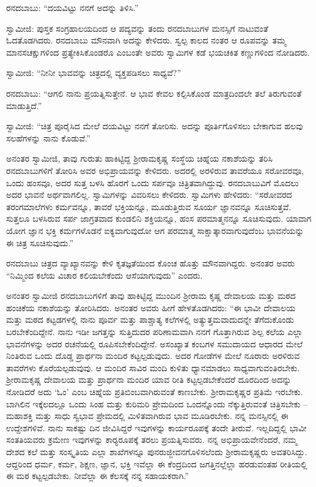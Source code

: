  ರನದಬಾಬು: “ದಯವಿಟ್ಟು ನನಗೆ ಅದನ್ನು ತಿಳಿಸಿ.” 

 ಸ್ವಾಮೀಜಿ: ಪುಸ್ತಕ ಸಂಗ್ರಹಾಲಯದಿಂದ ಆ ಪದ್ಯವನ್ನು ತಂದು ರನದಬಾಬುಗಳ ಮನಸ್ಸಿಗೆ ನಾಟುವಂತೆ ಓದತೊಡಗಿದರು. ರನದಬಾಬು ಮೌನವಾಗಿ ಅದನ್ನು ಕೇಳಿದರು. ಸ್ವಲ್ಪ ಕಾಲದ ನಂತರ ಆ ರೂಪವನ್ನು ತಮ್ಮ ಮಾನಸಚಕ್ಷುಗಳಿಂದ ಪ್ರತ್ಯೇಕಿಸಿಕೊಂಡರೊ ಎಂಬಂತೇ ಅವರು ಸ್ವಾಮಿಗಳ ಕಡೆ ಭಯಚಕಿತ ಕಣ್ಣುಗಳಿಂದ ನೋಡಿದರು. 

 ಸ್ವಾಮೀಜಿ: “ನೀನೀ ಭಾವವನ್ನು ಚಿತ್ರದಲ್ಲಿ ವ್ಯಕ್ತಪಡಿಸಲು ಸಾಧ್ಯವೆ?” 

 ರನದಬಾಬು: “ಆಗಲಿ ನಾನು ಪ್ರಯತ್ನಿಸುತ್ತೇನೆ. ಆ ಭಾವ ಕೇವಲ ಕಲ್ಪಿಸಿಕೊಂಡ ಮಾತ್ರದಿಂದಲೇ ತಲೆ ತಿರುಗುವಂತೆ ಮಾಡುತ್ತಿದೆ.” 

 ಸ್ವಾಮೀಜಿ: “ಚಿತ್ರ ಪೂರೈಸಿದ ಮೇಲೆ ದಯವಿಟ್ಟು ನನಗೆ ತೋರಿಸು. ಅದನ್ನು ಪೂರ್ತಿಗೊಳಿಸಲು ಬೇಕಾಗುವ ಹಲವು ಸಲಹೆಗಳನ್ನು ನಾನು ಕೊಡುವೆ.” 

 ಅನಂತರ ಸ್ವಾಮೀಜಿ, ತಾವು ಗುರುತು ಹಾಕಿಟ್ಟಿದ್ದ ಶ‍್ರೀರಾಮಕೃಷ್ಣ ಸಂಸ್ಥೆಯ ಚಿಹ್ನೆಯ ನಕಾಶೆಯನ್ನು ತರಿಸಿ ರನದಬಾಬುಗಳಿಗೆ ತೋರಿಸಿ ಅವರ ಅಭಿಪ್ರಾಯವನ್ನು ಕೇಳಿದರು. ಅದರಲ್ಲಿ ಅರಳಿರುವ ತಾವರೆಯೂ ಸರೋವರವೂ, ಒಂದು ಹಂಸವೂ, ಅದರ ಸುತ್ತ ಬಳಸಿ ಹೊರಗೆ ಒಂದು ಸರ್ಪವೂ ಚಿತ್ರಿತವಾಗಿದ್ದುವು. ರನದಬಾಬುವಿಗೆ ಮೊದಲು ಅದರ ಭಾವನೆ ಅರ್ಥವಾಗಲಿಲ್ಲ. ಸ್ವಾಮಿಗಳನ್ನು ವಿವರಿಸಲು ಕೇಳಿದರು. ಸ್ವಾಮಿಗಳು ಹೇಳಿದರು: “ಸರೋವರದ ತರಂಗಮಾಲೆಗಳು ಕರ್ಮವನ್ನೂ, ತಾವರೆ ಭಕ್ತಿಯನ್ನೂ, ಮೂಡುತ್ತಿರುವ ಸೂರ್ಯ ಜ್ಞಾನವನ್ನೂ ಸೂಚಿಸುತ್ತವೆ. ಸುತ್ತಲೂ ಬಳಸಿರುವ ಸರ್ಪ ಜಾಗ್ರತವಾದ ಕುಂಡಲಿನಿ ಶಕ್ತಿಯನ್ನೂ, ಹಂಸ ಪರಮಾತ್ಮನನ್ನೂ ಸೂಚಿಸುವುದು. ಯಾವಾಗ ಯೋಗ ಜ್ಞಾನ ಭಕ್ತಿ ಕರ್ಮಗಳೊಡನೆ ಐಕ್ಯವಾಗುವುದೋ ಆಗ ಪರಮಾತ್ಮ ಸಾಕ್ಷಾತ್ಕಾರವಾಗುವುದೆಂಬ ಭಾವನೆಯನ್ನು ಈ ಚಿತ್ರ ಸೂಚಿಸುವುದು.” 

 ರನದಬಾಬು ಚಿತ್ರದ ವ್ಯಾಖ್ಯಾನವನ್ನು ಕೇಳಿ ಕೃತಜ್ಞತೆಯಿಂದ ಕೊಂಚ ಹೊತ್ತು ಮೌನವಾಗಿದ್ದರು. ಅನಂತರ ಅವರು “ನಿಮ್ಮಿಂದ ಕಲೆಯ ವಿಚಾರ ಕಲಿಯಬೇಕೆಂದು ಆಸೆಯಾಗುವುದು” ಎಂದರು. 

 ಅನಂತರ ಸ್ವಾಮೀಜಿ ರನದಬಾಬುಗಳಿಗೆ ತಾವು ಹಾಕಿಟ್ಟಿದ್ದ ಮುಂದಿನ ಶ‍್ರೀರಾಮ ಕೃಷ್ಣ ದೇವಾಲಯ ಮತ್ತು ಮಠದ ಹಂಚಿಕೆಯ ನಕಾಶೆಯನ್ನು ತೋರಿಸಿದರು. ಅನಂತರ ಅವರು ಹೀಗೆ ಹೇಳತೊಡಗಿದರು: “ಈ ಭಾವೀ ದೇವಾಲಯ ಮತ್ತು ಮಠದ ಕಟ್ಟಡಗಳಲ್ಲಿ ನಾನು ಪೂರ್ವ ಮತ್ತು ಪಾಶ್ಚಾತ್ಯ ಕಲೆಗಳಲ್ಲಿ ಅತ್ಯುತ್ತಮವಾದುದನ್ನೇ ತೆಗೆದುಕೊಂಡು ಬರಬೇಕೆಂದಿದ್ದೇನೆ. ನಾನು ಇಡೀ ಜಗತ್ತನ್ನು ಸುತ್ತಿದುದರ ಪರಿಣಾಮವಾಗಿ ನನಗೆ ಗೊತ್ತಾಗಿರುವ ಶಿಲ್ಪ ಕಲೆಯ ಎಲ್ಲಾ ಭಾವನೆಗಳನ್ನು ಅದರ ರಚನೆಯಲ್ಲಿ ರೂಪಿಸಬೇಕೆಂದಿದ್ದೇನೆ. ಅಸಂಖ್ಯಾತ ಕಂಬಗಳ ಸಮುದಾಯದ ಆಧಾರದ ಮೇಲೆ ನಿಂತಿರುವ ಒಂದು ದೊಡ್ಡ ಪ್ರಾರ್ಥನಾ ಮಂದಿರ ಕಟ್ಟಲ್ಪಡುವುದು. ಅದರ ಗೋಡೆಗಳ ಮೇಲೆ ನೂರಾರು ಅರಳಿರುವ ತಾವರೆಗಳು ಕೊರೆಯಲ್ಪಡುವುವು. ಆ ಮಂದಿರ ಸಾವಿರ ಮಂದಿ ಕುಳಿತು ಧ್ಯಾನಮಾಡಲು ಸಾಧ್ಯವಾಗುವಂತಿರಬೇಕು. ಶ‍್ರೀರಾಮಕೃಷ್ಣ ದೇವಾಲಯ ಮತ್ತು ಪ್ರಾರ್ಥನಾ ಮಂದಿರ ಯಾವ ರೀತಿ ಕಟ್ಟಲ್ಪಡಬೇಕೆಂದರೆ ದೂರದಿಂದ ಅದನ್ನು ನೋಡಿದರೆ ಅದು ‘ಓಂ’ ಎಂಬ ಚಿಹ್ನೆಯ ಪ್ರತಿಬಿಂಬವಾಗಿರುವಂತೆ ಕಾಣಬೇಕು. ಶ‍್ರೀರಾಮಕೃಷ್ಣರ ಪ್ರತಿಮೆ ಇರಬೇಕು. ಬಾಗಿಲಿನ ಇಕ್ಕೆಲದಲ್ಲೂ ಒಂದು ಸಿಂಹ ಮತ್ತು ಕುರಿಮರಿ ಪ್ರೇಮದಿಂದ ಒಂದನ್ನೊಂದು ನೆಕ್ಕುತ್ತಿರುವಂತೆ ಚಿತ್ರಿಸಬೇಕು – ಮಹಾಶಕ್ತಿ ಮತ್ತು ಸಾಧು ಸ್ವಭಾವ ಪ್ರೇಮದಲ್ಲಿ ಮಿಳಿತವಾಗಿರುವ ಭಾವ ಮೂಡಿರಬೇಕು. ನನ್ನ ಮನಸ್ಸಿನಲ್ಲಿ ಈ ಉದ್ದೇಶಗಳಿವೆ. ನಾನು ಸಾಕಷ್ಟು ದಿನ ಜೀವಿಸಿದ್ದರೆ ಇವುಗಳನ್ನು ಕಾರ್ಯರೂಪಕ್ಕೆ ತಂದೇ ತೀರುವೆ. ಇಲ್ಲದಿದ್ದಲ್ಲಿ ಭಾವೀ ಸಂತತಿಯವರು ಕ್ರಮೇಣ ಇವುಗಳನ್ನು ಕಾರ‍್ಯರೂಪಕ್ಕೆ ತರಲು ಪ್ರಯತ್ನಿಸುವರು. ನನ್ನ ಅಭಿಪ್ರಾಯವೇನೆಂದರೆ, ನಮ್ಮ ದೇಶದ ಕಲೆ ಮತ್ತು ಸಂಸ್ಕೃತಿಯ ಎಲ್ಲಾ ಶಾಖೆಗಳನ್ನೂ ಪುನರುಜ್ಜೀವನಗೊಳಿಸಲೆಂದು ಶ‍್ರೀರಾಮಕೃಷ್ಣರು ಅವತರಿಸಿದ್ದು. ಆದ್ದರಿಂದ ಧರ್ಮ, ಕರ್ಮ, ಶಿಕ್ಷಣ, ಜ್ಞಾನ, ಭಕ್ತಿ ಇವೆಲ್ಲಾ ಈ ಕೆಂದ್ರದಿಂದ ಜಗತ್ತಿನಲ್ಲೆಲ್ಲಾ ಹರಡುವಂತಹ ರೀತಿಯಲ್ಲಿ ಈ ಮಠ ಕಟ್ಟಲ್ಪಡಬೇಕು. ನೀವೆಲ್ಲಾ ಈ ಕೆಲಸಕ್ಕೆ ನನ್ನ ಸಹಾಯಕರಾಗಿ.” 

